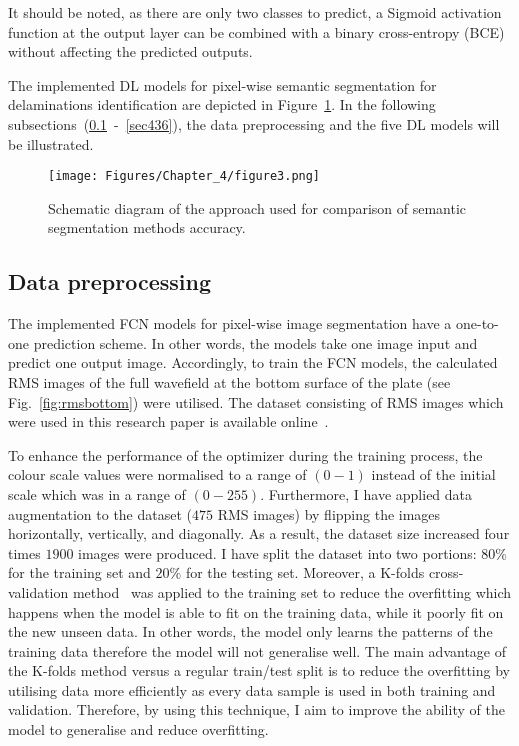 It should be noted, as there are only two classes to predict, a Sigmoid activation function at the output layer can be combined with a binary cross-entropy (BCE) without affecting the predicted outputs.

The implemented DL models for pixel-wise semantic segmentation for delaminations identification are depicted in Figure~\ref{fig:flowchart}.
In the following subsections~(\ref{sec431}~-~\ref{sec436}), the data preprocessing and the five DL models will be illustrated.
\begin{figure} [h!]
	\begin{center}
		\texttt{[image: Figures/Chapter\_4/figure3.png]}
	\end{center}
	\caption{Schematic diagram of the approach used for comparison of semantic segmentation methods accuracy.} 
	\label{fig:flowchart}
\end{figure}
\subsection{Data preprocessing}
\label{sec431}
The implemented FCN models for pixel-wise image segmentation have a one-to-one prediction scheme.
In other words, the models take one image input and predict one output image.
Accordingly, to train the FCN models, the calculated RMS images of the full wavefield at the bottom surface of the plate (see Fig.~\ref{fig:rmsbottom}) were utilised.
The dataset consisting of RMS images which were used in this research paper is available online~\cite{Kudela2020d}.

To enhance the performance of the optimizer during the training process, the colour scale values were normalised to a range of \((0-1)\) instead of the initial scale which was in a range of \((0-255)\). 
Furthermore, I have applied data augmentation to the dataset (\(475\) RMS images) by flipping the images horizontally, vertically, and diagonally. 
As a result, the dataset size increased four times \(1900\) images were produced. 
I have split the dataset into two portions: \(80\%\) for the training set and \(20\%\) for the testing set. 
Moreover, a K-folds cross-validation method~\cite{Srinivasan2019} was applied to the training set to reduce the overfitting which happens when the model is able to fit on the training data, while it poorly fit on the new unseen data. 
In other words, the model only learns the patterns of the training data therefore the model will not generalise well. 
The main advantage of the K-folds method versus a regular train/test split is to reduce the overfitting by utilising data more efficiently as every data sample is used in both training and validation. 
Therefore, by using this technique, I aim to improve the ability of the model to generalise and reduce overfitting.
